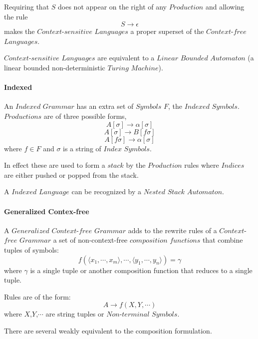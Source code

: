 \documentclass{article}
\begin{document}
Requiring that $S$ does not appear on the right of any $Production$
and allowing the rule
\[
    S \rightarrow \epsilon
\]
makes the $Context$-$sensitive$ $Languages$ a proper superset of the
$Context$-$free$ $Languages$.

$Context$-$sensitive$ $Languages$ are equivalent to a $Linear$
$Bounded$ $Automaton$ (a linear bounded non-deterministic $Turing$
$Machine$).

\paragraph{Indexed}

An $Indexed$ $Grammar$ has an extra set of $Symbols$ $F$, the
$Indexed$ $Symbols$. $Productions$ are of three possible forms,
\[
    A[\sigma] \rightarrow \alpha[\sigma]
\]\[
    A[\sigma] \rightarrow B[f\sigma]
\]\[
    A[f\sigma] \rightarrow \alpha[\sigma]
\]
where $f \in F$ and $\sigma$ is a string of $Index$ $Symbols$.

In effect these are used to form a $stack$ by the $Production$ rules
where $Indices$ are either pushed or popped from the stack.

A $Indexed$ $Language$ can be recognized by a $Nested$ $Stack$
$Automaton$.

\paragraph{Generalized Contex-free}
A $Generalized$ $Context$-$free$ $Grammar$ adds to the rewrite rules
of a $Context$-$free$ $Grammar$ a set of non-context-free
$composition$ $functions$ that combine tuples of symbols:
\[
    f(\langle x_1,\cdots,x_m\rangle,\cdots,\langle
    y_1,\cdots,y_n\rangle)=\gamma
\]
where $\gamma$ is a single tuple or another composition function that
reduces to a single tuple.

Rules are of the form:
\[
    A \rightarrow f(X,Y,\cdots)
\]
where $X$,$Y$,$\cdots$ are string tuples or $Non$-$terminal$
$Symbols$.

There are several weakly equivalent to the composition formulation.
\end{document}
